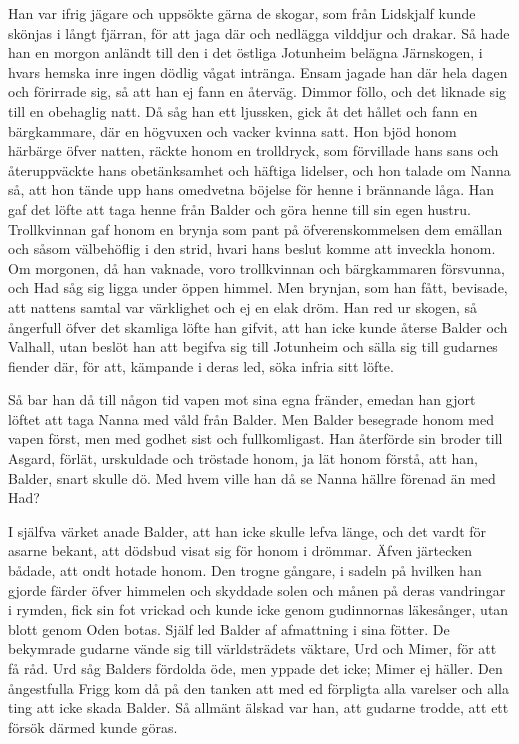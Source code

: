 Han var ifrig jägare och uppsökte gärna de skogar, som från Lidskjalf
kunde skönjas i långt fjärran, för att jaga där och nedlägga vilddjur
och drakar. Så hade han en morgon anländt till den i det östliga
Jotunheim belägna Järnskogen, i hvars hemska inre ingen dödlig vågat
intränga. Ensam jagade han där hela dagen och förirrade sig, så att han
ej fann en återväg. Dimmor föllo, och det liknade sig till en obehaglig
natt. Då såg han ett ljussken, gick åt det hållet och fann en
bärgkammare, där en högvuxen och vacker kvinna satt. Hon bjöd honom
härbärge öfver natten, räckte honom en trolldryck, som förvillade hans
sans och återuppväckte hans obetänksamhet och häftiga lidelser, och hon
talade om Nanna så, att hon tände upp hans omedvetna böjelse för henne i
brännande låga. Han gaf det löfte att taga henne från Balder och göra
henne till sin egen hustru. Trollkvinnan gaf honom en brynja som pant på
öfverenskommelsen dem emällan och såsom välbehöflig i den strid, hvari
hans beslut komme att inveckla honom. Om morgonen, då han vaknade, voro
trollkvinnan och bärgkammaren försvunna, och Had såg sig ligga under
öppen himmel. Men brynjan, som han fått, bevisade, att nattens samtal
var värklighet och ej en elak dröm. Han red ur skogen, så ångerfull
öfver det skamliga löfte han gifvit, att han icke kunde återse Balder
och Valhall, utan beslöt han att begifva sig till Jotunheim och sälla
sig till gudarnes fiender där, för att, kämpande i deras led, söka
infria sitt löfte.

Så bar han då till någon tid vapen mot sina egna fränder,
emedan han gjort löftet att taga Nanna med våld från Balder. Men Balder
besegrade honom med vapen först, men med godhet sist och fullkomligast.
Han återförde sin broder till Asgard, förlät, urskuldade och tröstade
honom, ja lät honom förstå, att han, Balder, snart skulle dö. Med hvem
ville han då se Nanna hällre förenad än med Had?

I själfva värket anade Balder, att han icke skulle lefva länge, och det
vardt för asarne bekant, att dödsbud visat sig för honom i drömmar.
Äfven järtecken bådade, att ondt hotade honom. Den trogne gångare, i
sadeln på hvilken han gjorde färder öfver himmelen och skyddade solen
och månen på deras vandringar i rymden, fick sin fot vrickad och kunde
icke genom gudinnornas läkesånger, utan blott genom Oden botas. Själf
led Balder af afmattning i sina fötter. De bekymrade gudarne vände sig
till världsträdets väktare, Urd och Mimer, för att få råd. Urd såg
Balders fördolda öde, men yppade det icke; Mimer ej häller. Den
ångestfulla Frigg kom då på den tanken att med ed förpligta alla
varelser och alla ting att icke skada Balder. Så allmänt älskad var han,
att gudarne trodde, att ett försök därmed kunde göras.

